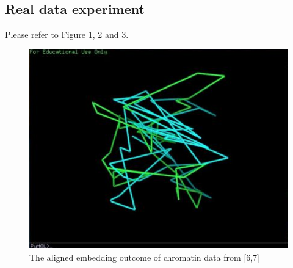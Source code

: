 \documentclass[12pt]{article} %
\begin{document}
\subsection{Real data experiment}
	Please refer to Figure 1, 2 and 3.
	\begin{figure}[ht]\centering
		\includegraphics[scale=0.3]{Figure_1}
		\caption{The aligned embedding outcome of chromatin data from [6,7]}
	\end{figure}
\end{document}
